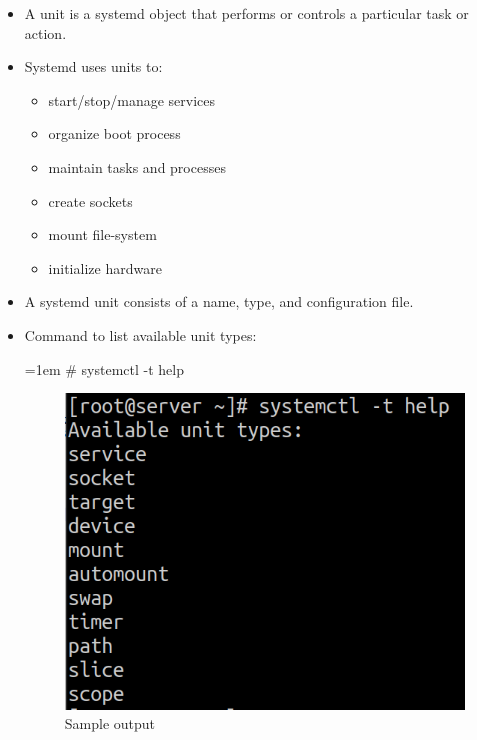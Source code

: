 
\begin{flushleft}
	\begin{itemize}
		\item A unit is a systemd object that performs or controls a particular task or action. 
		\item Systemd uses units to:
		\begin{itemize}
			\item start/stop/manage services
			\item organize boot process
			\item maintain tasks and processes
			\item create sockets
			\item mount file-system
			\item initialize hardware
		\end{itemize}
		\item A systemd unit consists of a name, type, and configuration file.
		\item Command to list available unit types:
		\begin{tcolorbox}[breakable,notitle,boxrule=1pt,colback=black,colframe=black]
			\color{green}
			\font=1em
			\# systemctl -t help
			\font=4pt
		\end{tcolorbox}
		
		\begin{figure}[h!]
			\centering
			\includegraphics[scale=.5]{content/chapter1/images/units.png}
			\caption{Sample output}
			\label{fig:mascot}
		\end{figure}	
	

\end{itemize}
\end{flushleft}
